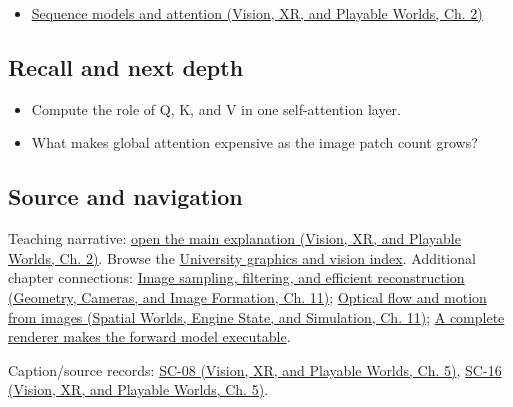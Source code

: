 \begin{itemize}
\tightlist
\item
  \href{../07-Vision-XR-and-Playable-Worlds/main.pdf\#nameddest=04-visual-computing-ii-ch031-sequence-models-and-attention}{Sequence models and attention (Vision, XR, and Playable Worlds, Ch. 2)}
\end{itemize}

\subsection{Recall and next depth}\label{appendix-a9d5dfdd164a-recall-and-next-depth}

\hypertarget{appendix-a9d5dfdd164a-recall-and-next-depth}{}

\begin{itemize}
\tightlist
\item
  Compute the role of Q, K, and V in one self-attention layer.
\item
  What makes global attention expensive as the image patch count grows?
\end{itemize}

\subsection{Source and navigation}\label{appendix-a9d5dfdd164a-source-and-navigation}

\hypertarget{appendix-a9d5dfdd164a-source-and-navigation}{}

Teaching narrative: \href{../07-Vision-XR-and-Playable-Worlds/main.pdf\#nameddest=04-visual-computing-ii-ch031-sequence-models-and-attention}{open the main explanation (Vision, XR, and Playable Worlds, Ch. 2)}. Browse the \hyperref[appendix-a6d556a4ef50-university-graphics-vision-and-photography---independent-series]{University graphics and vision index}. Additional chapter connections: \href{../03-Geometry-Cameras-and-Image-Formation/main.pdf\#nameddest=03-visual-computing-i-ch004-image-sampling-filtering-and-efficient-reconstruction}{Image sampling, filtering, and efficient reconstruction (Geometry, Cameras, and Image Formation, Ch. 11)}; \href{../05-Spatial-Worlds-Engine-State-and-Simulation/main.pdf\#nameddest=04-visual-computing-ii-ch030-optical-flow-and-motion-from-images}{Optical flow and motion from images (Spatial Worlds, Engine State, and Simulation, Ch. 11)}; \hyperref[04-visual-computing-ii-ch035-a-complete-renderer-makes-the-forward-model-executable]{A complete renderer makes the forward model executable}.

Caption/source records: \href{../07-Vision-XR-and-Playable-Worlds/main.pdf\#nameddest=04-visual-computing-ii-ch036-sc-08---stanford-cs231n-spring-2025-lecture-8-attention-and-transformers}{SC-08 (Vision, XR, and Playable Worlds, Ch. 5)}, \href{../07-Vision-XR-and-Playable-Worlds/main.pdf\#nameddest=04-visual-computing-ii-ch036-sc-16---stanford-cs231n-deep-learning-for-computer-vision-spring-2025-lecture-16-vision-and-language}{SC-16 (Vision, XR, and Playable Worlds, Ch. 5)}.
